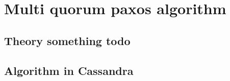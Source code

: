 \chapter{Multi quorum paxos algorithm}\label{chapter:algo}

\section{Theory something todo}

\section{Algorithm in Cassandra}\label{sec:algo:c}

